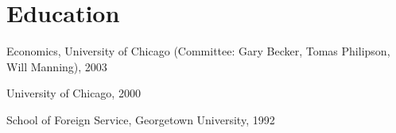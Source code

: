 \documentclass[11pt,letterpaper]{report}
\newcommand{\listitemspace}{0.25em}
\renewenvironment{itemize}
{\begin{list}{}{\setlength{\leftmargin}{0em}
                \setlength{\parskip}{0em}
                \setlength{\itemsep}{\listitemspace}
                \setlength{\parsep}{\listitemspace}}}
{\end{list}}
\begin{document}




    
    \section*{Education}

    \begin{tablist}

        \item[Ph.D.] \tab{}Economics, University of Chicago (Committee: Gary Becker, Tomas Philipson, Will Manning), 2003

        
        
        \item[J.D.]  \tab{}University of Chicago, 2000
        \item[B.S.F.S.]  \tab{}School of Foreign Service, Georgetown University, 1992

    \end{tablist}
\end{document}
